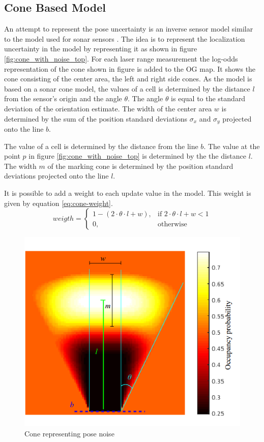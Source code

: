\subsection{Cone Based Model}
An attempt to represent the pose uncertainty is an inverse sensor model similar to the model used for sonar sensors  \cite{probRob}.  
The idea is to represent the localization uncertainty in the model by representing it as shown in figure \vref{fig:cone_with_noise_top}.
For each laser range measurement the log-odds representation of the cone shown in figure is added to the OG map.
It shows the cone consisting of the center area, the left and right side cones. 
As the model is based on a sonar cone model, the values of a cell is determined by the distance \(l\) from the sensor's origin and the angle \(\theta\). 
The angle \(\theta\) is equal to the standard deviation of the orientation estimate. 
The width of the center area $w$ is determined by the sum of the position standard deviations $\sigma_x$ and $\sigma_y$ projected onto the line $b$. 

The value of a cell is determined by the distance from the line $b$. 
The value at the point $p$ in figure \vref{fig:cone_with_noise_top} is determined by the the distance \(l\).
The width $m$ of the marking cone is determined by the position standard deviations projected onto the line $l$.

It is possible to add a weight to each update value in the model. This weight is given by equation \vref{eq:cone-weight}.
\begin{equation}
\label{eq:cone-weight}
weigth = 
\begin{cases}
1 - ( 2 \cdot \theta \cdot l + w), & \text{if } 2 \cdot \theta \cdot l + w < 1\\
0, & \text{otherwise}
\end{cases}
\end{equation}

\begin{figure}[htbp]
	\centering
	\includegraphics[width=\textwidth]{figures/static_mapping/cone_noise_top}
	\caption{Cone representing pose noise }
	\label{fig:cone_with_noise_top}
\end{figure}


